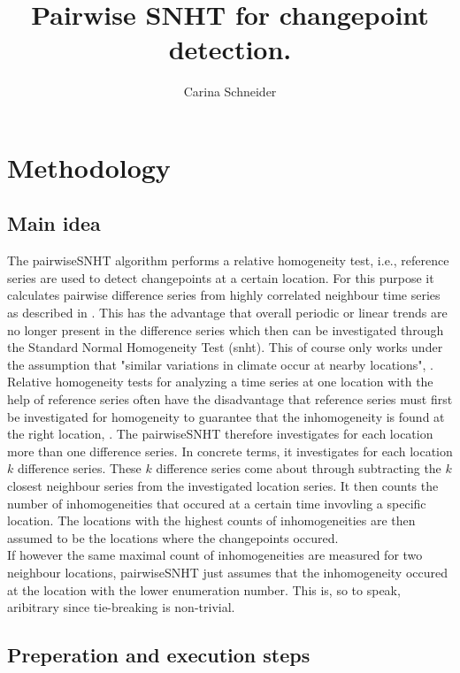 \documentclass[nojss]{jss}
\title{\bf Pairwise SNHT for changepoint detection.}
\author{Carina Schneider}
\begin{document}



\section{Methodology}

\subsection{Main idea}
The pairwiseSNHT algorithm performs a relative homogeneity test, i.e., reference series are used to detect changepoints at a certain location. For this purpose it calculates pairwise difference series from highly correlated neighbour time series as described in \cite{menne09}. This has the advantage that overall periodic or linear trends are no longer present in the difference series which then can be investigated through the Standard Normal Homogeneity Test (snht).  This of course only works under the assumption that "similar variations in climate occur at nearby locations", \cite{menne09}.\\

Relative homogeneity tests for analyzing a time series at one location with the help of reference series often have the disadvantage that reference series must first be investigated for homogeneity to guarantee that the inhomogeneity is found at the right location, \cite{menne09}. The pairwiseSNHT therefore investigates for each location more than one difference series. In concrete terms, it investigates for each location $k$ difference series. These $k$ difference series come about through subtracting the $k$ closest neighbour series from the investigated location series.  It then counts the number of inhomogeneities that occured at a certain time invovling a specific location. The locations with the highest counts of inhomogeneities are then assumed to be the locations where the changepoints occured.\\

If however the same maximal count of inhomogeneities are measured for two neighbour locations, pairwiseSNHT just assumes that the inhomogeneity occured at the location with the lower enumeration number. This is, so to speak, aribitrary since tie-breaking is non-trivial.

\subsection{Preperation and execution steps}
\end{document}

